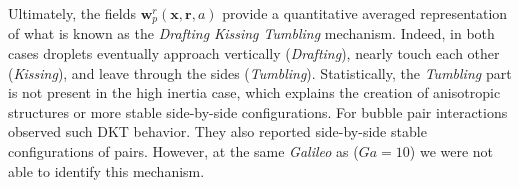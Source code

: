 Ultimately, the fields $\textbf{w}^r_p(\textbf{x},\textbf{r}, a)$ provide a quantitative averaged representation of what is known as the \textit{Drafting Kissing Tumbling} \citep{fortes1987nonlinear} mechanism. 
Indeed, in both cases droplets eventually approach vertically (\textit{Drafting}), nearly touch each other (\textit{Kissing}), and leave through the sides (\textit{Tumbling}). 
Statistically, the \textit{Tumbling} part is not present in the high inertia case, which explains the creation of anisotropic structures or more stable side-by-side configurations. 
For bubble pair interactions \citet{zhang2021three} observed such DKT behavior.
They also reported side-by-side stable configurations of pairs. 
However, at the same \textit{Galileo} as \citet{zhang2021three} ($Ga = 10$) we were not able to identify this mechanism. 


